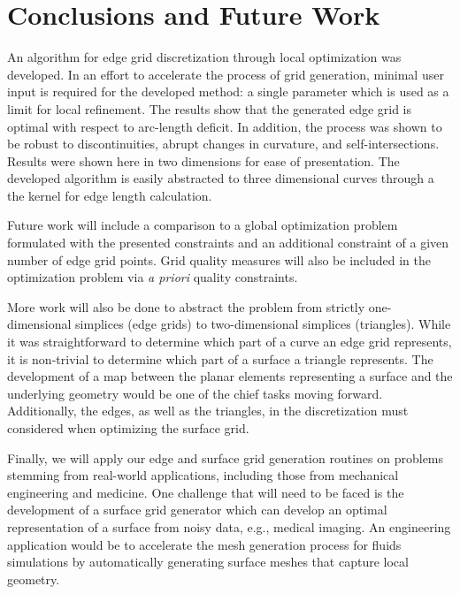 \section{Conclusions and Future Work}
An algorithm for edge grid discretization through local optimization was 
developed. In an effort to accelerate the process of grid generation, 
minimal user input is required for the developed method: a single 
parameter which is used as a limit for local refinement. The results show 
that the generated edge grid is optimal with respect to arc-length 
deficit. In addition, the process was shown to be robust to 
discontinuities, abrupt changes in curvature, and self-intersections. 
Results were shown here in two dimensions for ease of presentation. The 
developed algorithm is easily abstracted to three dimensional curves
through a the kernel for edge length calculation.

Future work will include a comparison to a global optimization problem 
formulated with the presented constraints and an additional constraint of 
a given number of edge grid points. Grid quality measures will also be 
included in the optimization problem via {\it a priori} quality 
constraints.

More work will also be done to abstract the problem from strictly 
one-dimensional simplices (edge grids) to two-dimensional simplices 
(triangles). While it was straightforward to determine which part of a 
curve an edge grid represents, it is non-trivial to determine which part 
of a surface a triangle represents. The development of a map between the 
planar elements representing a surface and the underlying geometry would 
be one of the chief tasks moving forward. Additionally, the edges, as well 
as the triangles, in the discretization must considered when optimizing 
the surface grid.

Finally, we will apply our edge and surface grid generation routines on 
problems stemming from real-world applications, including those from 
mechanical engineering and medicine.  One challenge that will need to be 
faced is the development of a surface grid generator which can develop 
an optimal representation of a surface from noisy data, e.g., medical
imaging. An engineering application would be to accelerate the mesh generation
process for fluids simulations by automatically generating surface meshes
that capture local geometry.
